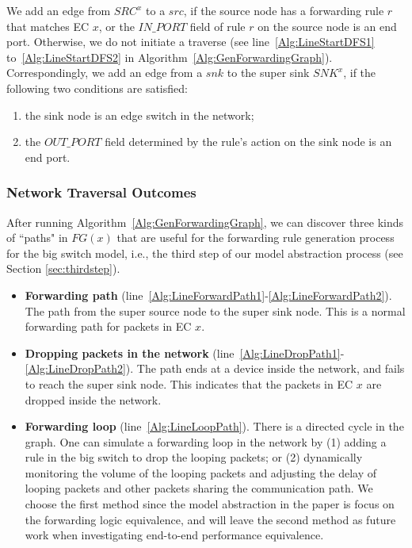 We add an edge from $SRC^x$ to a $src$, if the source node has a forwarding rule $r$ that matches EC $x$, or the $IN\_PORT$ field of rule $r$ on the source node is an end port.
Otherwise, we do not initiate a traverse (see line~\ref{Alg:LineStartDFS1} to~\ref{Alg:LineStartDFS2} in Algorithm~\ref{Alg:GenForwardingGraph}).
Correspondingly, we add an edge from a $snk$ to the super sink $SNK^x$, if the following two conditions are satisfied:
\begin{enumerate}
\item the sink node is an edge switch in the network;
\item the $OUT\_PORT$ field determined by the rule's action on the sink node is an end port.
\end{enumerate}



\subsubsection{Network Traversal Outcomes}
After running Algorithm~\ref{Alg:GenForwardingGraph}, we can discover three kinds of ``paths" in $FG(x)$ that are useful for the forwarding rule generation process for the big switch model, i.e., the third step of our model abstraction process (see Section \ref{sec:thirdstep}).

\begin{itemize}
\item \textbf{Forwarding path} (line~\ref{Alg:LineForwardPath1}-\ref{Alg:LineForwardPath2}).
        The path from the super source node to the super sink node.
        This is a normal forwarding path for packets in EC $x$.

\item \textbf{Dropping packets in the network} (line~\ref{Alg:LineDropPath1}-\ref{Alg:LineDropPath2}).
        The path ends at a device inside the network, and fails to reach the super sink node. This indicates that the packets in EC $x$ are dropped inside the network.

\item \textbf{Forwarding loop} (line~\ref{Alg:LineLoopPath}).
        There is a directed cycle in the graph. One can simulate a forwarding loop in the network by (1) adding a rule in the big switch to drop the looping packets; or (2) dynamically monitoring the volume of the looping packets and adjusting the delay of looping packets and other packets sharing the communication path. We choose the first method since the model abstraction in the paper is focus on the forwarding logic equivalence, and will leave the second method as future work when investigating end-to-end performance equivalence.
\end{itemize}

